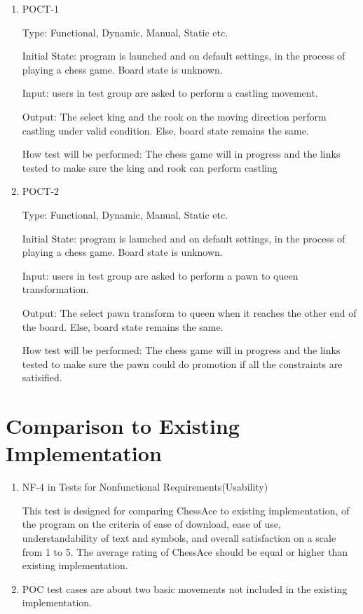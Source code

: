 \documentclass[12pt, titlepage]{article}
\begin{document}
\begin{enumerate}


\item{POCT-1\\}

Type: Functional, Dynamic, Manual, Static etc.
					
Initial State: program is launched and on default settings, in the process of playing a chess game. Board state is unknown.
					
Input: users in test group are asked to perform a castling movement.
					
Output: The select king and the rook on the moving direction perform castling under valid condition. Else, board state remains the same.
					
How test will be performed:  The chess game will in progress and the links tested to make sure the king and rook can perform castling
					
\item{POCT-2\\}

Type: Functional, Dynamic, Manual, Static etc.
					
Initial State:  program is launched and on default settings, in the process of playing a chess game. Board state is unknown.
					
Input: users in test group are asked to perform a pawn to queen transformation.
					
Output: The select pawn transform to queen when it reaches the other end of the board. Else, board state remains the same.
					
How test will be performed:  The chess game will in progress and the links tested to make sure the pawn could do promotion if all the constraints are satisified. 

\end{enumerate}
\section{Comparison to Existing Implementation}
	
\begin{enumerate}
\item {NF-4 in Tests for Nonfunctional Requirements(Usability)}

This test is designed for comparing ChessAce to existing implementation, of the program on the criteria of ease of download, ease of use, understandability of text and symbols, and overall satisfaction on a scale from 1 to 5. The average rating of ChessAce should be equal or higher than existing implementation. 

\item POC test cases are about two basic movements not included in the existing implementation.
\end{enumerate}		
\newpage
\end{document}
